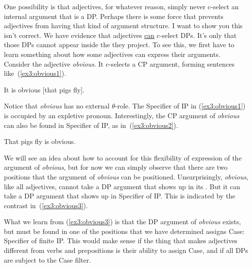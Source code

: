 One possibility is that adjectives, for whatever reason, simply never c-select an internal argument that is a DP. Perhaps there is some force that prevents adjectives from having that kind of argument structure. I want to show you this isn't correct. We have evidence that adjectives \uline{can} c-select DPs. It's only that those DPs cannot appear inside the  they project. To see this, we first have to learn something about how some adjectives can express their arguments. Consider the adjective \emph{obvious}. It c-selects a CP argument, forming sentences like~(\ref{ex3:obvious1}).
\begin{exe}
	\raggedright
	\ex \label{ex3:obvious1} 
	It is obvious [\CP that pigs fly].
\end{exe}
Notice that \emph{obvious} has no external \mbox{$\theta$-role}. The Specifier of IP in (\ref{ex3:obvious1}) is occupied by an expletive pronoun. Interestingly, the CP argument of \emph{obvious} can also be found in Specifier of IP, as in~(\ref{ex3:obvious2}).
\begin{exe}
	\raggedright
	\ex \label{ex3:obvious2} 
	That pigs fly is obvious.
\end{exe}
We will see an idea about how to account for this flexibility of expression of the argument of \emph{obvious}, but for now we can simply observe that there are two positions that the argument of \emph{obvious} can be positioned. Unsurprisingly, \emph{obvious}, like all adjectives, cannot take a DP argument that shows up in its . But it can take a DP argument that shows up in Specifier of IP. This is indicated by the contrast in~(\ref{ex3:obvious3}).
\begin{exe}
	\raggedright
	\ex \label{ex3:obvious3} 
	\begin{xlist}
	\end{xlist}
\end{exe}
What we learn from (\ref{ex3:obvious3}) is that the DP argument of \emph{obvious} exists, but must be found in one of the positions that we have determined assigns Case: Specifier of finite IP. This would make sense if the thing that makes adjectives different from verbs and prepositions is their ability to assign Case, and if all DPs are subject to the Case filter.

